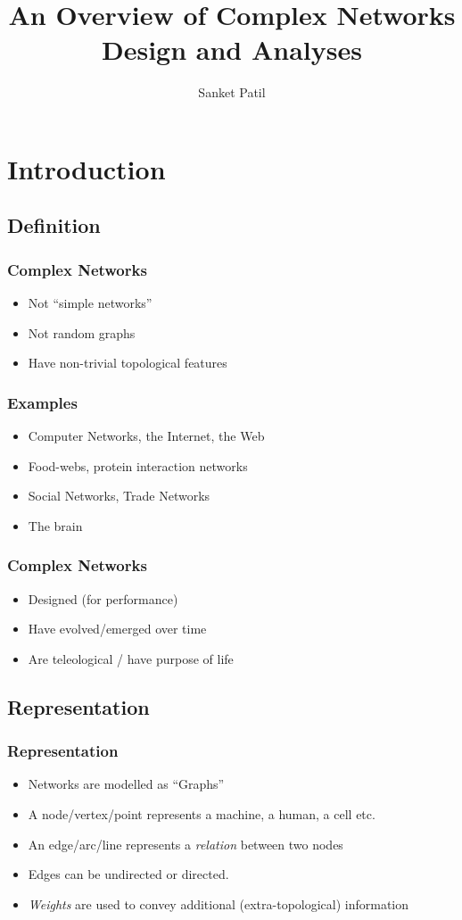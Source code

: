 \documentclass{beamer}
\title{An Overview of Complex Networks Design and Analyses}
\author[Sanket Patil]{Sanket Patil}
\begin{document}
\frame {\titlepage}

\section[Outline]{}
	\frame{\tableofcontents}

\section{Introduction}
	\subsection{Definition}
	\frame
				{
				\frametitle{Complex Networks}
				\begin{itemize}
					\item<1-> {Not ``simple networks''}
					\item<2-> {Not random graphs}
					\item<3-> {Have non-trivial topological features}
				\end{itemize}				
				}
				
			

		\frame
			{
			\frametitle{Examples}
			\begin{itemize}
				\item<1-> {Computer Networks, the Internet, the Web}
				
				\item<2-> {Food-webs, protein interaction networks}
				
				\item<3-> {Social Networks, Trade Networks}
				
				\item<4-> {The brain}
			\end{itemize}
			}
		
		\frame
		{
			\frametitle{Complex Networks}
			\begin{itemize}
				\item<1-> {Designed (for performance)}
				\item<2-> {Have evolved/emerged over time}
				\item<3-> {Are teleological / have purpose of life}
			\end{itemize}
		}
	\subsection{Representation}		
				\frame
				{
					\frametitle{Representation}
					\begin{itemize}			
						\item<1-> {Networks are modelled as ``Graphs''}
						\item<1-> {A node/vertex/point represents a machine, a human, a cell etc.}
						\item<1-> {An edge/arc/line represents a \textit{relation} between two nodes}
						\item<1-> {Edges can be undirected or directed.}
						\item<1-> {\textit{Weights} are used to convey additional (extra-topological) information}
					\end{itemize}
						
				}
\end{document}
